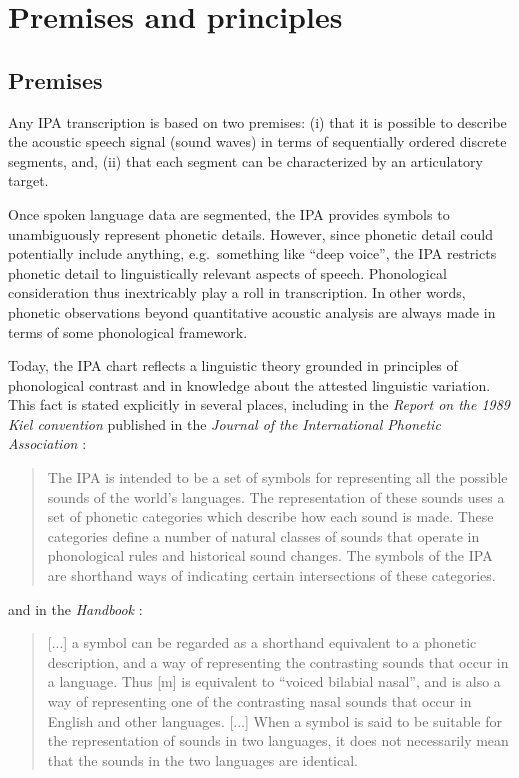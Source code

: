 
\section{Premises and principles}
\label{IPApremises-principles}
\subsection*{Premises}
\label{IPApremises}

Any IPA transcription is based on two premises: (i) that it is possible to
describe the acoustic speech signal (sound waves) in terms of sequentially
ordered discrete segments, and, (ii) that each segment can be characterized by
an articulatory target.

Once spoken language data are segmented, the IPA provides symbols to
unambiguously represent phonetic details. However, since phonetic detail could
potentially include anything, e.g.\ something like ``deep voice'', the IPA
restricts phonetic detail to linguistically relevant aspects of speech.
Phonological consideration thus inextricably play a roll in transcription. In
other words, phonetic observations beyond quantitative acoustic analysis are
always made in terms of some phonological framework.

Today, the IPA chart reflects a linguistic theory grounded in principles of
phonological contrast and in knowledge about the attested linguistic variation.
This fact is stated explicitly in several places, including in the
\textit{Report on the 1989 Kiel convention} published in the \textit{Journal of
the International Phonetic Association} \citep[67-68]{International1989report}:

\begin{quote}
The IPA is intended to be a set of symbols for representing all the possible 
sounds of the world's languages. The representation of these sounds uses a set 
of phonetic categories which describe how each sound is made. These categories 
define a number of natural classes of sounds that operate in phonological rules 
and historical sound changes. The symbols of the IPA are shorthand ways of 
indicating certain intersections of these categories.
\end{quote}

\noindent and in the \textit{Handbook} \citep[18]{IPA1999}: 

\begin{quote}
[...] a symbol can be regarded as a shorthand equivalent to a phonetic
description, and a way of representing the contrasting sounds that occur in a
language. Thus [m] is equivalent to ``voiced bilabial nasal'', and is also a way
of representing one of the contrasting nasal sounds that occur in English and
other languages. [...] When a symbol is said to be suitable for the
representation of sounds in two languages, it does not necessarily mean that the
sounds in the two languages are identical.
\end{quote}

